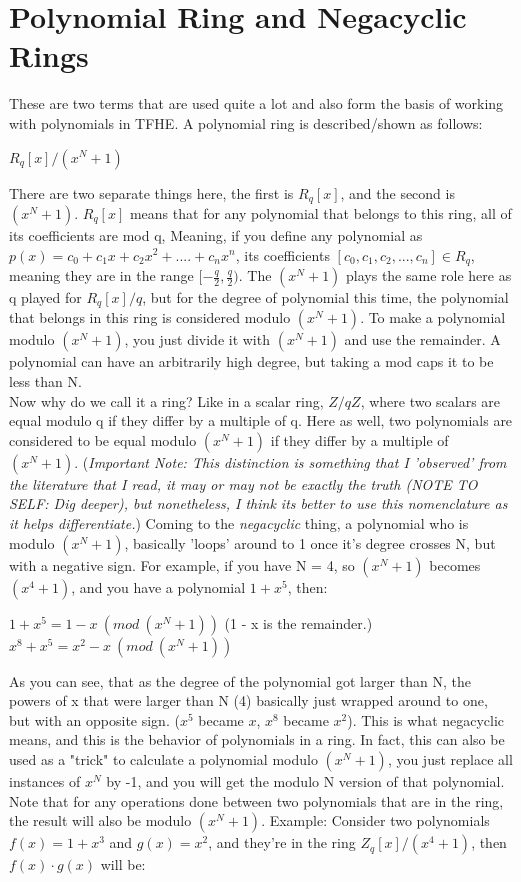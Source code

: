 \documentclass{report}
\begin{document}
	\section{Polynomial Ring and Negacyclic Rings}
		These are two terms that are used quite a lot and also form the basis of working with polynomials in TFHE. A polynomial ring is described/shown as follows:
		\begin{center}
			$R_q[x]/(x^N + 1)$
		\end{center}
		There are two separate things here, the first is $R_q[x]$, and the second is  $(x^N + 1)$. $R_q[x]$ means that for any polynomial that belongs to this ring, all of its coefficients are mod q, Meaning, if you define any polynomial as $p(x) = c_0 + c_1x + c_2x^2 + .... + c_nx^n$, its coefficients $[c_0, c_1, c_2, ..., c_n] \in R_q$, meaning they are in the range $[-\frac{q}{2}, \frac{q}{2})$. The $(x^N + 1)$ plays the same role here as q played for $R_q[x]/q$, but for the degree of polynomial this time, the polynomial that belongs in this ring is considered modulo $(x^N + 1)$. To make a polynomial modulo $(x^N + 1)$,  you just divide it with $(x^N + 1)$ and use the remainder. A polynomial can have an arbitrarily high degree, but taking a mod caps it to be less than N.\\
		Now why do we call it a ring? Like in a scalar ring, $Z/qZ$, where two scalars are equal modulo q if they differ by a multiple of q. Here as well, two polynomials are considered to be equal modulo $(x^N + 1)$ if they differ by a multiple of $(x^N + 1)$. \newline
		(\textit{Important Note: This distinction is something that I 'observed' from the literature that I read, it may or may not be exactly the truth (NOTE TO SELF: Dig deeper),  but nonetheless, I think its better to use this nomenclature as it helps differentiate.}) \newline		
		Coming to the \textit{negacyclic} thing, a polynomial who is modulo $(x^N + 1)$, basically 'loops' around to 1 once it's degree crosses N, but with a negative sign. For example, if you have N = 4, so $(x^N + 1)$ becomes $(x^4 + 1)$, and you have a polynomial $1 + x^5$, then:
		\begin{center}
			$1 + x^5 = 1 - x \:  (mod \: (x^N + 1))$ (1 - x is the remainder.) \\
			$x^8 + x^5 = x^2 - x \:  (mod \: (x^N + 1))$
		\end{center}
		As you can see, that as the degree of the polynomial got larger than N, the powers of x that were larger than N (4) basically just wrapped around to one, but with an opposite sign. ($ x^5$ became $x$, $x^8$ became $x^2$). This is what negacyclic means, and this is the behavior of polynomials in a ring. In fact, this can also be used as a "trick" to calculate a polynomial modulo $(x^N + 1)$, you just replace all instances of $x^N$ by -1, and you will get the modulo N version of that polynomial. Note that for any operations done between two polynomials that are in the ring, the result will also be modulo $(x^N + 1)$. Example: Consider two polynomials $f(x) = 1 + x^3$ and $g(x) = x^2$, and they're in the ring $Z_q[x]/(x^4 + 1)$, then $f(x) \cdot g(x)$ will be:
\end{document}
